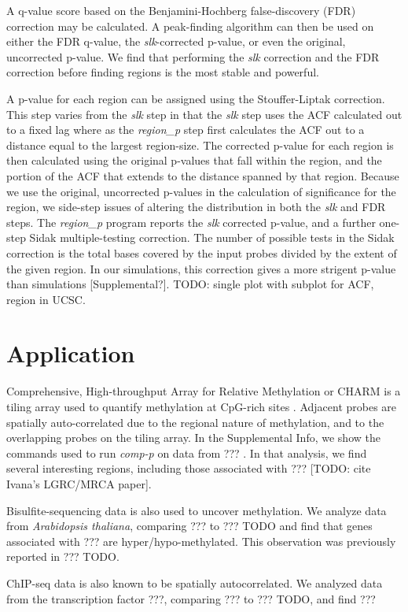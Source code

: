 \documentclass{bioinfo}
\begin{document}
\begin{methods}
A q-value score based on the Benjamini-Hochberg false-discovery (FDR) correction
 may be calculated. A peak-finding algorithm can then be used on either the FDR
q-value, the \textit{slk}-corrected p-value, or even the original, uncorrected 
p-value. We find that performing the \textit{slk} correction and the FDR correction
before finding regions is the most stable and powerful.

A p-value for each region can be assigned using the Stouffer-Liptak correction.
This step varies from the \textit{slk} step in that the \textit{slk} step uses
the ACF calculated out to a fixed lag where as the \textit{region\_p} step first
calculates the ACF out to a distance equal to the largest region-size. The
corrected p-value for each region is then calculated using the original p-values that
fall within the region, and the portion of the ACF that extends to the distance
spanned by that region. Because we use the original, uncorrected p-values in the
calculation of significance for the region, we side-step issues of altering the
distribution in both the \textit{slk} and FDR steps. The \textit{region\_p}
program reports the \textit{slk} corrected p-value, and a further one-step
Sidak \citep{Sidak}
multiple-testing correction. The number of possible tests in the Sidak correction
is the total bases covered by the input probes divided by the extent of the
given region. In our simulations, this correction gives a more strigent p-value
than simulations [Supplemental?].
TODO: single plot with subplot for ACF, region in UCSC.

\section{Application}
Comprehensive, High-throughput Array for Relative Methylation or CHARM is a
tiling array used to quantify methylation at CpG-rich sites \citep{Irizarry}.
Adjacent probes are spatially auto-correlated due to the regional nature of
methylation, and to the overlapping probes on the tiling array. In the
Supplemental Info, we show the commands used to run \textit{comp-p} on data from
??? . In that analysis, we find several interesting regions, including those
associated with ??? [TODO: cite Ivana's LGRC/MRCA paper].

Bisulfite-sequencing data is also used to uncover methylation. We analyze
data from {\it Arabidopsis thaliana}, comparing ??? to ??? TODO and find
that genes associated with ??? are hyper/hypo-methylated. This observation
was previously reported in ??? TODO.

ChIP-seq data is also known to be spatially autocorrelated. We analyzed data
from the transcription factor ???, comparing ??? to ??? TODO, and find
???

\end{methods}
\end{document}
